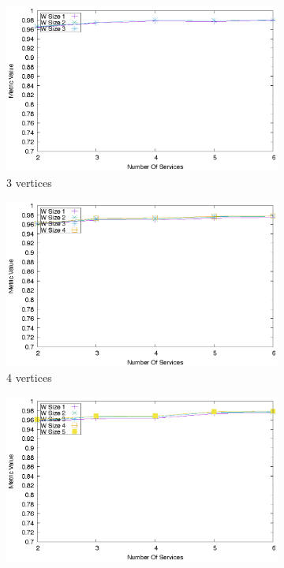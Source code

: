 \begin{figure}[ht]
  \centering
  \begin{subfigure}{0.33\textwidth}
    \includegraphics[width=\textwidth]{Images/graphs/quality_plot_good_n3.eps}
    \caption{3 vertices}
    \label{fig:first}
  \end{subfigure}
  \hfill
  \begin{subfigure}{0.33\textwidth}
    \includegraphics[width=\textwidth]{Images/graphs/quality_plot_good_n4.eps}
    \caption{4 vertices}
    \label{fig:second}
  \end{subfigure}
  \hfill
  \begin{subfigure}{0.33\textwidth}
    \includegraphics[width=\textwidth]{Images/graphs/quality_plot_good_n5.eps}

\end{subfigure}
\end{figure}
